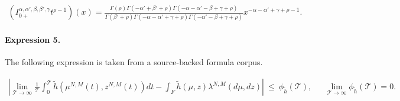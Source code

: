 \documentclass[11pt]{article}
\begin{document}
\begin{align*}\left(I_{0+}^{\alpha,\alpha',\beta,\beta',\gamma}t^{\rho-1}\right)(x)=\frac{\Gamma(\rho)\Gamma(-\alpha'+\beta'+\rho)\Gamma(-\alpha-\alpha'-\beta+\gamma+\rho)}{\Gamma(\beta'+\rho)\Gamma(-\alpha-\alpha'+\gamma+\rho)\Gamma(-\alpha'-\beta+\gamma+\rho)}x^{-\alpha-\alpha'+\gamma+\rho-1}.\end{align*}

\paragraph{Expression 5.} The following expression is taken from a source-backed formula corpus.

\begin{align*} |\lim_{\mathcal{T}\rightarrow\infty}\frac{1}{\mathcal{T}}\int_0^\mathcal{T} \tilde h(\mu^{N,M}(t),z^{N,M}(t))dt- \int_{F}\tilde{h}(\mu,z)\lambda^{N,M}(d\mu,dz)|\ \leq \ \phi_{\tilde h}(\mathcal{T}), \ \ \ \ \ \ \ \lim_{\mathcal{T}\rightarrow\infty}\phi_{\tilde h}(\mathcal{T}) = 0.\end{align*}
\end{document}
